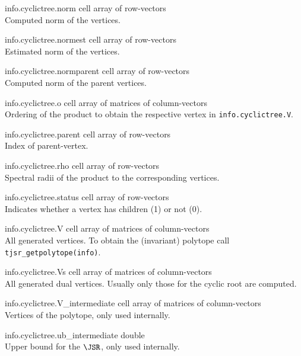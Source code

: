 \begin{param}
\item[info.cyclictree.norm] cell array of row-vectors\\Computed norm of the vertices.
\item[info.cyclictree.normest] cell array of row-vectors\\Estimated norm of the vertices.
\item[info.cyclictree.normparent] cell array of row-vectors\\Computed norm of the parent vertices.
\item[info.cyclictree.o] cell array of matrices of column-vectors\\Ordering of the product to obtain the respective vertex in \texttt{info.cyclictree.V}.
\item[info.cyclictree.parent] cell array of row-vectors\\Index of parent-vertex.
\item[info.cyclictree.rho] cell array of row-vectors\\Spectral radii of the product to the corresponding vertices.
\item[info.cyclictree.status] cell array of row-vectors\\Indicates whether a vertex has children (1) or not (0).
\item[info.cyclictree.V] cell array of matrices of column-vectors\\All generated vertices. To obtain the (invariant) polytope call \texttt{tjsr\_getpolytope(info)}.
\item[info.cyclictree.Vs] cell array of matrices of column-vectors\\All generated dual vertices. Usually only those for the cyclic root are computed.
\item[info.cyclictree.V\_intermediate] cell array of matrices of column-vectors\\Vertices of the polytope, only used internally.
\item[info.cyclictree.ub\_intermediate] double\\Upper bound for the $\JSR$, only used internally.
\end{param}


